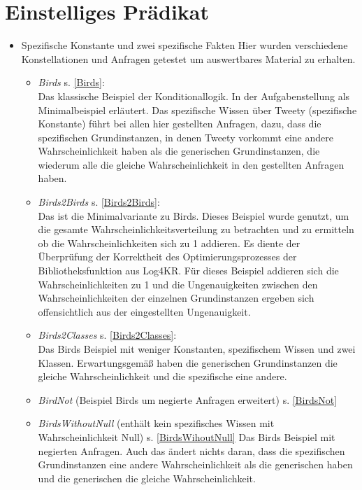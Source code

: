 \documentclass[draft]{scrreprt}
\begin{document}
\section{Einstelliges Prädikat}
\begin{itemize}


\item{Spezifische Konstante und zwei spezifische Fakten}
Hier wurden verschiedene Konstellationen und Anfragen getestet um auswertbares Material zu erhalten.
\begin{itemize}
	\item \textsl{Birds} \label{BBirds} s. \ref{Birds}: \\
	Das klassische Beispiel der Konditionallogik. In der Aufgabenstellung als Minimalbeispiel erläutert. Das spezifische Wissen über Tweety (spezifische Konstante) führt bei allen hier gestellten Anfragen, dazu, dass die spezifischen Grundinstanzen, in denen Tweety vorkommt eine andere Wahrscheinlichkeit haben als die generischen Grundinstanzen, die wiederum alle die gleiche Wahrscheinlichkeit in den gestellten Anfragen haben.
	
	\item \textsl{Birds2Birds} \label{BBirds2Birds} s. \ref{Birds2Birds}:\\
	Das ist die Minimalvariante zu Birds. Dieses Beispiel wurde genutzt, um die gesamte Wahrscheinlichkeitsverteilung zu betrachten und zu ermitteln ob die Wahrscheinlichkeiten sich zu 1 addieren. Es diente der Überprüfung der Korrektheit des Optimierungsprozesses der Bibliotheksfunktion aus Log4KR. Für dieses Beispiel addieren sich die Wahrscheinlichkeiten zu 1 und die Ungenauigkeiten zwischen den Wahrscheinlichkeiten der einzelnen Grundinstanzen ergeben sich offensichtlich aus der eingestellten Ungenauigkeit.
	
	\item \textsl{Birds2Classes} \label{BBirds2Classes} s. \ref{Birds2Classes}:\\
	Das Birds Beispiel mit weniger Konstanten, spezifischem Wissen und zwei Klassen. Erwartungsgemäß haben die generischen Grundinstanzen die gleiche Wahrscheinlichkeit und die spezifische eine andere.
	
	\item \textsl{BirdNot} (Beispiel Birds um negierte Anfragen erweitert) \label{BBirdsNot} s. \ref{BirdsNot}
	
	\item \textsl{BirdsWithoutNull} (enthält kein spezifisches Wissen mit Wahrscheinlichkeit Null) \label{BBirdsWithoutNull} s. \ref{BirdsWihoutNull}
	Das Birds Beispiel mit negierten Anfragen. Auch das ändert nichts daran, dass die spezifischen Grundinstanzen eine andere Wahrscheinlichkeit als die generischen haben und die generischen die gleiche Wahrscheinlichkeit.
	

\end{itemize}
\end{itemize}
\end{document}
